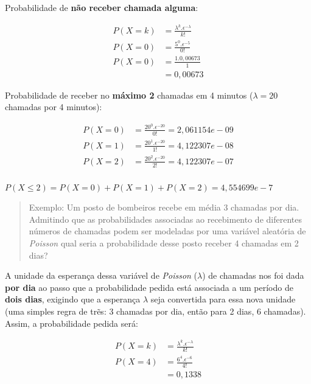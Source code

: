 \documentclass[
]{book}
\begin{document}
\hfill\break

Probabilidade de \textbf{não receber chamada alguma}:

\hfill\break

\begin{align*}
P(X=k) & = \frac{\lambda ^{k}. \epsilon^{-\lambda}} {k!} \\
P(X=0) & = \frac{5^{0}. \epsilon^{-5}} {0!} \\
P(X=0) & = \frac{1 . 0,00673}{1}\\
       & = 0,00673
\end{align*}

\hfill\break

Probabilidade de receber no \textbf{máximo 2} chamadas em 4 minutos (\(\lambda = 20\) chamadas por 4 minutos):

\hfill\break

\begin{align*}
P(X=0) & = \frac{20^{0}. \epsilon^{-20}} {0!} = 2,061154e-09 \\
P(X=1) & = \frac{20^{1}. \epsilon^{-20}} {1!} = 4,122307e-08 \\
P(X=2) & = \frac{20^{2}. \epsilon^{-20}} {2!} = 4,122307e-07 \\
\end{align*}

\(P(X \le 2)=P(X=0)+P(X=1)+P(X=2)=4,554699e-7\)

\hfill\break

\begin{quote}
Exemplo: Um posto de bombeiros recebe em média 3 chamadas por dia. Admitindo que as probabilidades associadas ao recebimento de diferentes números de chamadas podem ser modeladas por uma variável aleatória de \emph{Poisson} qual seria a probabilidade desse posto receber 4 chamadas em 2 dias?
\end{quote}

\hfill\break

A unidade da esperança dessa variável de \emph{Poisson} (\(\lambda\)) de chamadas nos foi dada \textbf{por dia} ao passo que a probabilidade pedida está associada a um período de \textbf{dois dias}, exigindo que a esperança \(\lambda\) seja convertida para essa nova unidade (uma simples regra de trẽs: 3 chamadas por dia, então para 2 dias, 6 chamadas). Assim, a probabilidade pedida será:

\hfill\break

\begin{align*}
P(X=k) & = \frac{\lambda ^{k}. \epsilon^{-\lambda}} {k!}\\
P(X=4) & = \frac{6^{4}. \epsilon^{-6}} {4!} \\
       & = 0,1338
\end{align*}
\end{document}
